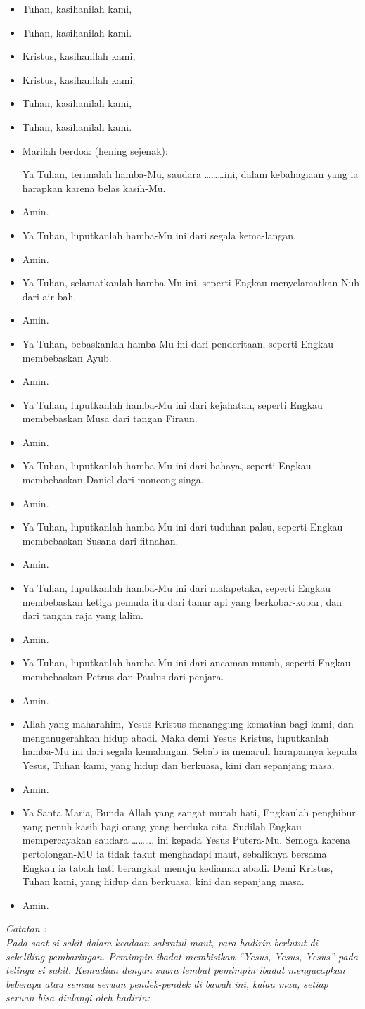 \documentclass[10pt,a5paper,fancyhdr]{memoir}
\newcommand{\BU}[1]{\begin{itemize}\itemsep0pt \item[U:] #1 \end{itemize}}
\newcommand{\BP}[1]{\begin{itemize}\itemsep0pt \item[P:] #1 \end{itemize}}
\newcommand{\nama}{\ldots\ldots\ldots}
\begin{document}
\BP{Tuhan, kasihanilah kami,} \BU{Tuhan, kasihanilah kami.} 
\BP{Kristus, kasihanilah kami,} \BU{Kristus, kasihanilah kami.} 
\BP{Tuhan, kasihanilah kami,} \BU{Tuhan, kasihanilah kami.} 
\BP{Marilah berdoa: (hening sejenak):
 
Ya Tuhan, terimalah hamba-Mu, saudara \nama ini, dalam 
kebahagiaan yang ia harapkan karena belas kasih-Mu.} 
\BU{Amin.} 
\BP{Ya Tuhan, luputkanlah hamba-Mu ini dari segala kema-langan.} 
\BU{Amin.} 
\BP{Ya Tuhan, selamatkanlah hamba-Mu ini, seperti Engkau 
menyelamatkan Nuh dari air bah. }
\BU{Amin. }
\BP{Ya Tuhan, bebaskanlah hamba-Mu ini dari penderitaan, seperti 
Engkau membebaskan Ayub.} 
\BU{Amin. }
\BP{Ya Tuhan, luputkanlah hamba-Mu ini dari kejahatan, seperti 
Engkau membebaskan Musa dari tangan Firaun. }
\BU{Amin.} 
\BP{Ya Tuhan, luputkanlah hamba-Mu ini dari bahaya, seperti Engkau 
membebaskan Daniel dari moncong singa.} 
\BU{Amin.} 
\BP{Ya Tuhan, luputkanlah hamba-Mu ini dari tuduhan palsu, seperti 
Engkau membebaskan Susana dari fitnahan.} 
\BU{Amin.} 
\BP{Ya Tuhan, luputkanlah hamba-Mu ini dari malapetaka, seperti 
Engkau membebaskan ketiga pemuda itu dari tanur api yang 
berkobar-kobar, dan dari tangan raja yang lalim.} 
\BU{Amin.} 
\BP{Ya Tuhan, luputkanlah hamba-Mu ini dari ancaman musuh, seperti 
Engkau membebaskan Petrus dan Paulus dari penjara.} 
\BU{Amin.} 
\BP{Allah yang maharahim, Yesus Kristus menanggung kematian bagi 
kami, dan menganugerahkan hidup abadi. Maka demi Yesus Kristus, 
luputkanlah hamba-Mu ini dari segala kemalangan. Sebab ia menaruh 
harapannya kepada Yesus, Tuhan kami, yang hidup dan berkuasa, 
kini dan sepanjang masa.} 
\BU{Amin.} 
\BP{Ya Santa Maria, Bunda Allah yang sangat murah hati, Engkaulah 
penghibur yang penuh kasih bagi orang yang berduka cita. Sudilah 
Engkau mempercayakan saudara \nama, ini kepada Yesus 
Putera-Mu. Semoga karena pertolongan-MU ia tidak takut 
menghadapi maut, sebaliknya bersama Engkau ia tabah hati 
berangkat menuju kediaman abadi. Demi Kristus, Tuhan kami, yang 
hidup dan berkuasa, kini dan sepanjang masa.} 
\BU{Amin.} 

\textit{Catatan : \\
Pada saat si sakit dalam keadaan sakratul maut, para hadirin 
berlutut di sekeliling pembaringan. Pemimpin ibadat membisikan 
“Yesus, Yesus, Yesus” pada telinga si sakit. 
Kemudian dengan suara lembut pemimpin ibadat mengucapkan 
beberapa atau semua seruan pendek-pendek di bawah ini, kalau 
mau, setiap seruan bisa diulangi oleh hadirin:} 
\end{document}
